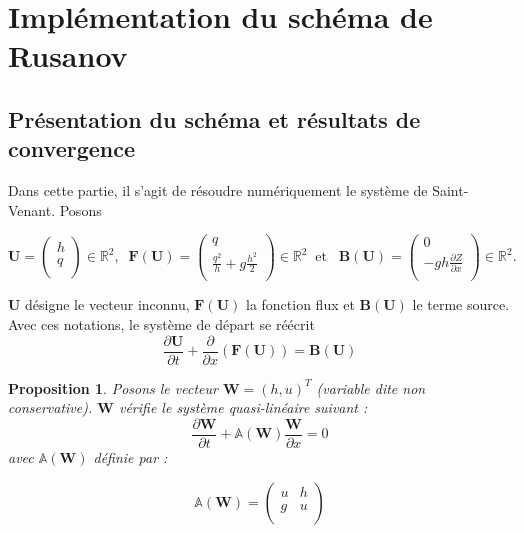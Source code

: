 \documentclass[
11pt, %
francais, %
singlespacing, %
headsepline, %
]{MastersDoctoralThesis} %
\newtheorem{prop}{Proposition}
\begin{document}
\section{Implémentation du schéma de Rusanov}

\subsection{Présentation du schéma et résultats de convergence}

Dans cette partie, il s'agit de résoudre numériquement le système de Saint-Venant. 
Posons

\begin{center}

$\textbf{U}=\begin{pmatrix}
   h \\
    q \\
\end{pmatrix}\in\mathbb{R}^{2},  \phantom{..} \textbf{F} (\textbf{U}) =\begin{pmatrix}
   q \\
   \frac{q^{2}}{h}+g\frac{h^{2}}{2} \\
\end{pmatrix}\in\mathbb{R}^{2} \phantom{..} \text{et} \phantom{...} \textbf{B} (\textbf{U}) =\begin{pmatrix}
   0 \\
   -gh \frac{\partial Z}{\partial x}\\
\end{pmatrix}\in\mathbb{R}^{2}.
$
\end{center}

$\textbf{U}$ désigne le vecteur inconnu, $\textbf{F} (\textbf{U})$ la fonction flux et $\textbf{B} (\textbf{U})$ le terme source. Avec ces notations,
le système de départ se réécrit $$\frac{\partial\textbf{U}}{\partial t}+\frac{\partial}{\partial x}(\textbf{F} (\textbf{U})) = \textbf{B} (\textbf{U})$$

\begin{prop}
Posons le vecteur $\textbf{W}= (h, u)^{T}$ (variable dite non conservative). $\textbf{W}$ vérifie le système quasi-linéaire suivant :
$$ \frac{\partial \textbf{W}}{\partial t} +\mathbb{A}(\textbf{W}) \frac{\textbf{W}}{\partial x} = 0 \label{ql} $$
avec $\mathbb{A}(\textbf{W})$ définie par :

$$\mathbb{A}(\textbf{W}) =\begin{pmatrix}
   u & h  \\
   g & u  \\
\end{pmatrix}$$

\end{prop}
\end{document}
